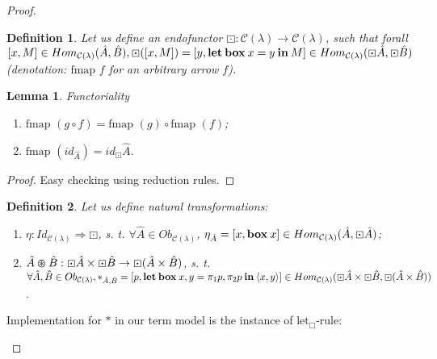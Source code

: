 \documentclass[a4paper]{article}
\newtheorem{lemma}{Lemma}
\newtheorem{defin}{Definition}
\begin{document}
\begin{proof}
\begin{defin}
  Let us define an endofunctor $\boxdot : \mathcal{C}(\lambda) \to \mathcal{C}(\lambda)$, such that
forall $[x,M] \in Hom_{\mathcal{C}(\lambda)}(\hat{A},\hat{B}), \boxdot ([x,M]) = [y, {\bf let \: box \:} x = y {\: \bf in \:} M] \in Hom_{\mathcal{C}(\lambda)}(\boxdot \hat{A}, \boxdot \hat{B})$
(denotation: $\text{fmap } f$ for an arbitrary arrow $f$).

\end{defin}

\begin{lemma} Functoriality

\begin{enumerate}
  \item $\text{fmap }(g \circ f) = \text{fmap }(g) \circ \text{fmap }(f)$;
  \item $\text{fmap }(id_{\hat{A}}) = id_{\boxdot}\hat{A}$.
\end{enumerate}
\end{lemma}

\begin{proof}

Easy checking using reduction rules.

\end{proof}

\begin{defin}

  Let us define natural transformations:

\begin{enumerate}
  \item $\eta: Id_{\mathcal{C}(\lambda)} \Rightarrow \boxdot$, s. t. $\forall \hat{A} \in Ob_{\mathcal{C}(\lambda)}$, $\eta_{\hat{A}} = [x, {\bf box \:} x] \in Hom_{\mathcal{C}(\lambda)}(\hat{A}, \boxdot \hat{A})$;
  \item $\hat{A} \varoast \hat{B} : \boxdot \hat{A} \times \boxdot \hat{B} \to \boxdot (\hat{A} \times \hat{B})$, s. t. $\forall \hat{A}, \hat{B} \in Ob_{\mathcal{C}(\lambda)}, \ast_{\hat{A},\hat{B}} = [p, {\bf let \: box \:} x,y = \pi_1 p, \pi_2 p {\: \bf in \:} \langle x, y \rangle] \in Hom_{\mathcal{C}(\lambda)}(\boxdot \hat{A} \times \boxdot \hat{B}, \boxdot (\hat{A} \times \hat{B}))$.
\end{enumerate}
\end{defin}

Implementation for $\ast$ in our term model is the instance of ${\text{let}_{\Box}}$-rule:

\begin{prooftree}
\end{prooftree}


\end{proof}
\end{document}
